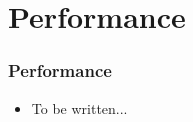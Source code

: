 \documentclass[handout]{beamer}
\theoremstyle{definition}
\begin{document}
\section{Performance}

\begin{frame}
  \frametitle{Performance}
  \begin{itemize}
  \item To be written...
  \end{itemize}
\end{frame}
\end{document}
